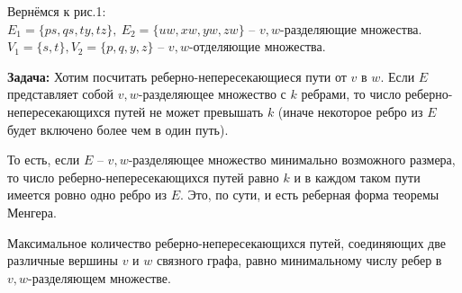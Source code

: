 	Вернёмся к рис.1: \\
	$E_1 = \{ ps, qs, ty, tz \}, \ E_2 = \{ uw, xw, yw, zw \}$ -- $v, w$-разделяющие множества. \\
	$V_1 = \{ s, t \}, V_2 = \{ p, q, y, z \}$ -- $v, w$-отделяющие множества.

	\textbf{Задача:} Хотим посчитать реберно-непересекающиеся пути от $v$ в $w$.
	Если $E$ представляет собой $v, w$-разделяющее множество с $k$ ребрами, то число реберно-непересекающихся путей не может превышать $k$
	(иначе некоторое ребро из $E$ будет включено более чем в один путь). 
	
	То есть, если $E$ -- $v,w$-разделяющее множество минимально возможного размера, то число реберно-непересекающихся путей равно $k$ и в каждом
	таком пути имеется ровно одно ребро из $E$. Это, по сути, и есть реберная форма теоремы Менгера.

	\begin{Thm}
		Максимальное количество реберно-непересекающихся путей, соединяющих две различные вершины $v$ и $w$ связного графа, равно минимальному числу ребер в $v,w$-разделяющем множестве.	
	\end{Thm}

